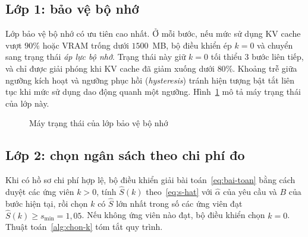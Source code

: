 \subsection{Lớp 1: bảo vệ bộ nhớ}

Lớp bảo vệ bộ nhớ có ưu tiên cao nhất. Ở mỗi bước, nếu mức sử dụng KV cache vượt $90\%$ hoặc VRAM trống dưới $1500$~MB, bộ điều khiển ép $k = 0$ và chuyển sang trạng thái \textit{áp lực bộ nhớ}. Trạng thái này giữ $k=0$ tối thiểu 3 bước liên tiếp, và chỉ được giải phóng khi KV cache đã giảm xuống dưới $80\%$. Khoảng trễ giữa ngưỡng kích hoạt và ngưỡng phục hồi (\textit{hysteresis}) tránh hiện tượng bật tắt liên tục khi mức sử dụng dao động quanh một ngưỡng. Hình~\ref{fig:may-trang-thai} mô tả máy trạng thái của lớp này.

\begin{figure}[htbp]
\centering
{}
\caption{Máy trạng thái của lớp bảo vệ bộ nhớ}
\label{fig:may-trang-thai}
\end{figure}

\subsection{Lớp 2: chọn ngân sách theo chi phí đo}

Khi có hồ sơ chi phí hợp lệ, bộ điều khiển giải bài toán~\eqref{eq:bai-toan} bằng cách duyệt các ứng viên $k > 0$, tính $\hat{S}(k)$ theo~\eqref{eq:s-hat} với $\hat{\alpha}$ của yêu cầu và $B$ của bước hiện tại, rồi chọn $k$ có $\hat{S}$ lớn nhất trong số các ứng viên đạt $\hat{S}(k) \ge s_{\min} = 1{,}05$. Nếu không ứng viên nào đạt, bộ điều khiển chọn $k=0$. Thuật toán~\ref{alg:chon-k} tóm tắt quy trình.


